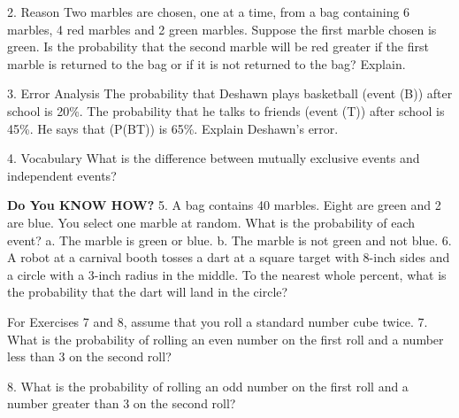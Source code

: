\documentclass{article}
\newenvironment{concept-summary}{}{}    %
\newcommand{\answer}[1]{}               %
\begin{document}
\begin{concept-summary}
2. Reason Two marbles are chosen, one at a time, from a bag containing 6 marbles, 4 red marbles and 2 green marbles. Suppose the first marble chosen is green. Is the probability that the second marble will be red greater if the first marble is returned to the bag or if it is not returned to the bag? Explain.
\answer{The probability is greater if the first marble is not returned to the bag. If the first marble is returned, there will be 6 marbles in the bag, of which 4 are red. If it is not returned, there will only be 5 marbles in the bag, of which 4 are red. (\frac45>\frac46).}
3. Error Analysis The probability that Deshawn plays basketball (event (B)) after school is 20\%. The probability that he talks to friends (event (T)) after school is 45\%. He says that (P(BT)) is 65\%. Explain Deshawn's error.
\answer{Because Deshawn is likely to talk to his friends while playing basketball, the two events are not mutually exclusive. So, he cannot find the probability of one or the other happening by adding them.}
4. Vocabulary What is the difference between mutually exclusive events and independent events?
\answer{Events are mutually exclusive if they do not share outcomes. Independent events can share outcomes, but the occurrence of one cannot affect the probability of the other happening.}
\textbf{Do You KNOW HOW?}
5. A bag contains 40 marbles. Eight are green and 2 are blue. You select one marble at random. What is the probability of each event?
a. The marble is green or blue. \answer{a. 0.25, 25\%, or (\frac14)}
b. The marble is not green and not blue. \answer{b. 0.75, 75\%, or (\frac34)}
6. A robot at a carnival booth tosses a dart at a square target with 8-inch sides and a circle with a 3-inch radius in the middle. To the nearest whole percent, what is the probability that the dart will land in the circle?
\answer{44\%}
For Exercises 7 and 8, assume that you roll a standard number cube twice.
7. What is the probability of rolling an even number on the first roll and a number less than 3 on the second roll?
\answer{(\frac16), (0.1\overline6), or (16.\overline6\%)}
8. What is the probability of rolling an odd number on the first roll and a number greater than 3 on the second roll?
\answer{(\frac14), 0.25, or 25\%}
\end{concept-summary}
\end{document}

